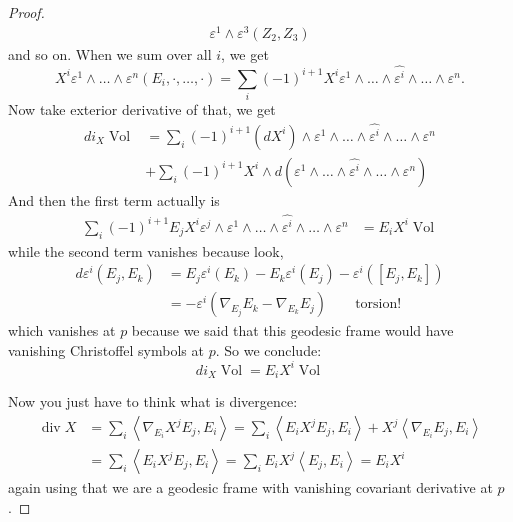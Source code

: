 \begin{proof}
\begin{align*}
\varepsilon^1\wedge\varepsilon^3(Z_2,Z_3)
\end{align*}
and so on. When we sum over all $i$, we get
$$
X^i\varepsilon^1\wedge\ldots\wedge
\varepsilon^n(E_i,\cdot,\ldots,\cdot)
=\sum_{i}(-1)^{i+1}
X^i\varepsilon^1\wedge\ldots\wedge\widehat{
\varepsilon^i}
\wedge\ldots\wedge\varepsilon^n.
$$
Now take exterior derivative of that, we get
$$
\begin{aligned}
d i_X\operatorname{Vol}
&=\sum_i(-1)^{i+1}(dX^i)
\wedge\varepsilon^1\wedge\ldots
\wedge\widehat{\varepsilon^i}
\wedge\ldots\wedge\varepsilon^n\\
&+\sum_{i}(-1)^{i+1}X^i\wedge
d(\varepsilon^1\wedge\ldots\wedge\widehat{
\varepsilon^i}\wedge\ldots
\wedge\varepsilon^n)\end{aligned}
$$
And then the first term actually is
$$
\begin{aligned}
\sum_i(-1)^{i+1}
E_jX^i\varepsilon^j\wedge\varepsilon^1
\wedge\ldots
\wedge\widehat{\varepsilon^i}
\wedge\ldots\wedge\varepsilon^n
&=E_iX^i\operatorname{Vol}
\end{aligned}
$$
while the second term vanishes because look,
$$
\begin{aligned}d \varepsilon^i(E_j,E_k)
&=E_j\varepsilon^i(E_k)-E_k\varepsilon^i(E_j)
-\varepsilon^i([E_j,E_k])\\
&=-\varepsilon^i(\nabla_{E_j}E_k-\nabla_{E_k}
E_j)\qquad
\text{torsion!}
\end{aligned}
$$
which vanishes at $p$ because we said that
this geodesic frame would have
 vanishing Christoffel symbols at $p$. So we
 conclude:
\[di_X
\operatorname{Vol}=E_iX^i\operatorname{Vol}\]

Now you just have to think what is
divergence:
$$
\begin{aligned}
\operatorname{div}X&=\sum_{i}
\left\langle{}\nabla_{E_i}X^jE_j,E_i\right\rangle{}
=\sum_{i}\left\langle{}E_iX^jE_j,E_i\right\rangle{}+
X^j\left\langle{}\nabla_{E_i}E_j,E_i\right\rangle{}\\
&=\sum_i
\left\langle{}E_iX^jE_j,E_i\right\rangle{}=
\sum_iE_iX^j\left\langle{}E_j,E_i\right\rangle{}=E_iX^i
\end{aligned}
$$
again using that we are a geodesic frame with
vanishing covariant
derivative at $p$.
\end{proof}

















